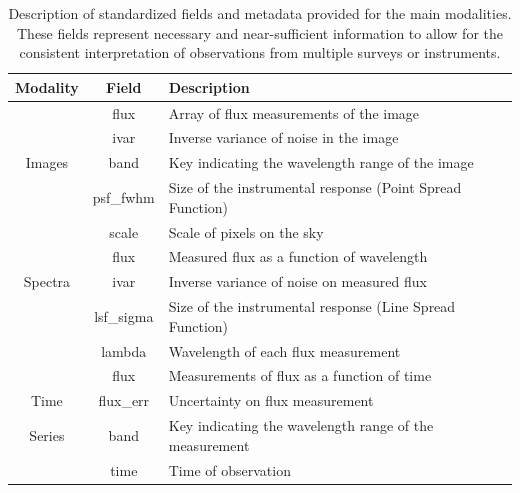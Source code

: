 \documentclass[dvipsnames,table]{article}
\newcommand{\FL}[1]{{\color{magenta}FL: #1}}
\begin{document}
\begin{table}[]
    \begin{threeparttable}[b]
    \centering
    \begin{tabular}{c c l}
        \toprule
        Modality & Field & Description
        \\
        \midrule
         \cellcolor{white} & flux & Array of flux measurements of the image \\
         \cellcolor{white} & ivar & Inverse variance of noise in the image \\
        \cellcolor{white} Images & band & Key indicating the wavelength range of the image \\
         \cellcolor{white} & psf\_fwhm & Size of the instrumental response (Point Spread Function) \\
         \cellcolor{white} & scale & Scale of pixels on the sky
         \\\arrayrulecolor{black!30}\midrule
        \cellcolor{white} & flux & Measured flux as a function of wavelength \\
        \cellcolor{white} Spectra & ivar & Inverse variance of noise on measured flux \\ 
        \cellcolor{white} & lsf\_sigma & Size of the instrumental response (Line Spread Function) \\
        \cellcolor{white} & lambda & Wavelength of each flux measurement \\\arrayrulecolor{black!30}\midrule
        \cellcolor{white} & flux  & Measurements of flux as a function of time \\ 
        \cellcolor{white} Time  & flux\_err & Uncertainty on flux measurement \\
        \cellcolor{white} Series & band & Key indicating the wavelength range of the measurement \\
        \cellcolor{white} & time & Time of observation \\
         \bottomrule
    \end{tabular}
    \caption{\small Description of standardized fields and metadata provided for the main modalities. These fields represent necessary and near-sufficient information to allow for the consistent interpretation of observations from multiple surveys or instruments.}
    \label{tab:fields_metadata}
    \end{threeparttable}
\end{table}

\end{document}
